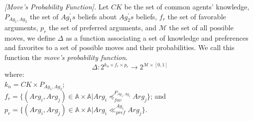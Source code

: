 
\begin{definition}{\emph{[Move's Probability Function].}} \label{probabilityfunction}
Let $CK$ be the set of common agents' knowledge, $P_{Ag_1,Ag_2}$ the set of $Ag_{1}^{\prime}s$ beliefs about $Ag_{2}^{\prime}s$
beliefs, $f_r$ the set of favorable arguments, $p_r$ the set of preferred arguments, and $\mathcal{M}$ the set of all possible
moves, we define $\Delta$ as a function associating a set of knowledge and preferences and favorites to a set of possible moves
and their probabilities. We call this function the \textit{move's probability function}.
\begin{equation}\label{equation17}
 \Delta : 2^{k_n \times f_{r} \times p_{r} } \rightarrow 2^{\mathcal{M} \times [0,1]}
\end{equation}
where:\\
$k_n = CK \times P_{Ag_1,Ag_2}$;\\
$f_r=\{(Arg_i, Arg_j) \in \mathbb{A} \times \mathbb{A} | Arg_i
\preceq_{fav}^{P_{Ag_1, Ag_2}} Arg_j\}$; and \\
$p_r=\{(Arg_i, Arg_j) \in \mathbb{A} \times \mathbb{A} | Arg_i
\ll_{pref}^{Ag_1} Arg_j\}$.
\end{definition}





